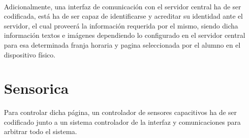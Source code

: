 \paragraph{} Adicionalmente, una interfaz de comunicación con el servidor central ha de ser codificada, está ha de ser capaz de identificarse y acreditar su identidad ante el servidor, el cual proveerá la información requerida por el mismo, siendo dicha información textos e imágenes dependiendo lo configurado en el servidor central para esa determinada franja horaria y pagina seleccionada por el alumno en el dispositivo físico.


\section{Sensorica}

\paragraph{} Para controlar dicha página, un controlador de sensores capacitivos ha de ser codificado junto a un sistema controlador de la interfaz y comunicaciones para arbitrar todo el sistema.